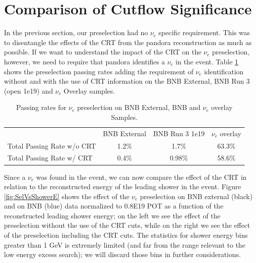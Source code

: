 \newpage
\section{Comparison of Cutflow Significance}\label{sec:Significance}
In the previous section, our preselection had no $\nu_e$ specific requirement. This was to disentangle the  effects of the CRT from the pandora reconstruction as much as possible. If we want to understand the impact of the CRT on the $\nu_e$ preselection, however, we need to require that pandora identifies a $\nu_e$ in the event.
Table \ref{tab:PSNue} shows the preselection passing rates adding the requirement of $\nu_e$ identification without and with the use of CRT information on the BNB External,  BNB Run 3 (open 1e19) and  $\nu_e$ Overlay samples. 


\begin{table}[h]
\begin{tabular}{ c || c | c || c | c || c | c || }
\cline{2-7}
                                            & \multicolumn{2}{c||}{BNB External} & \multicolumn{2}{c||}{BNB Run 3 1e19} & \multicolumn{2}{c||}{$\nu_e$ overlay} \\ \cline{1-7} 
\multicolumn{1}{|l||}{Total Passing Rate w/o CRT}    &         \multicolumn{2}{c||}{ 1.2\%}    &   \multicolumn{2}{c||}{1.7\%}  & \multicolumn{2}{c||}{63.3\%}\\ \hline
\multicolumn{1}{|l||}{Total Passing Rate w/ CRT}       &                 \multicolumn{2}{c||}{0.4\%}      & \multicolumn{2}{c||}{0.98\%}     &  \multicolumn{2}{c||}{58.6\% }   \\ \hline
\end{tabular}
\caption{Passing rates for $\nu_e$ preselection on BNB External, BNB and $\nu_e$ overlay Samples.}
\label{tab:PSNue}
\end{table}


Since a $\nu_e$ was found in the event, we can now compare the effect of the CRT in relation to the reconstructed energy of the leading shower in the event.
Figure \ref{fig:SelVsShowerE} shows the effect of the $\nu_e$ preselection on BNB external (black) and on BNB  (blue) data normalized to 0.8E19 POT as a function of the reconstructed leading shower energy; on the left we see the effect of the preselection without the use of the CRT cuts, while on the right we see the effect of the preselection including the  CRT cuts. The statistics for shower energy bins greater than 1 GeV is extremely limited (and far from the range relevant to the low energy excess search); we will discard those bins in further considerations. 

